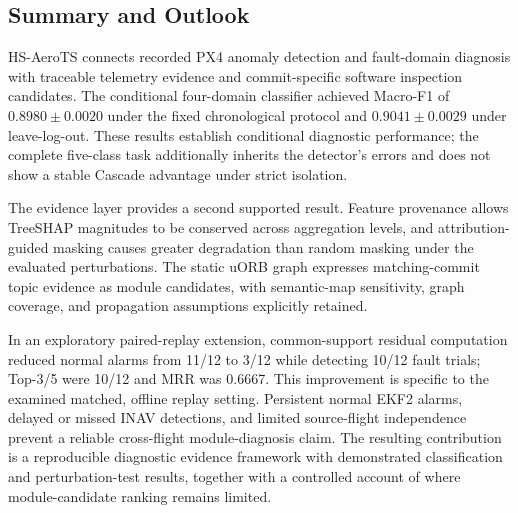 \subsection{Summary and Outlook}

HS-AeroTS connects recorded PX4 anomaly detection and fault-domain diagnosis with traceable telemetry evidence and commit-specific software inspection candidates. The conditional four-domain classifier achieved Macro-F1 of $0.8980\pm0.0020$ under the fixed chronological protocol and $0.9041\pm0.0029$ under leave-log-out. These results establish conditional diagnostic performance; the complete five-class task additionally inherits the detector's errors and does not show a stable Cascade advantage under strict isolation.

The evidence layer provides a second supported result. Feature provenance allows TreeSHAP magnitudes to be conserved across aggregation levels, and attribution-guided masking causes greater degradation than random masking under the evaluated perturbations. The static uORB graph expresses matching-commit topic evidence as module candidates, with semantic-map sensitivity, graph coverage, and propagation assumptions explicitly retained.

In an exploratory paired-replay extension, common-support residual computation reduced normal alarms from 11/12 to 3/12 while detecting 10/12 fault trials; Top-3/5 were 10/12 and MRR was 0.6667. This improvement is specific to the examined matched, offline replay setting. Persistent normal EKF2 alarms, delayed or missed INAV detections, and limited source-flight independence prevent a reliable cross-flight module-diagnosis claim. The resulting contribution is a reproducible diagnostic evidence framework with demonstrated classification and perturbation-test results, together with a controlled account of where module-candidate ranking remains limited.

